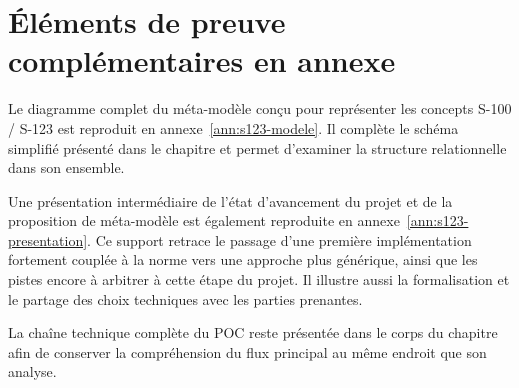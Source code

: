 
\section{Éléments de preuve complémentaires en annexe}

Le diagramme complet du méta-modèle conçu pour représenter les concepts S-100 / S-123 est reproduit en annexe~\ref{ann:s123-modele}. Il complète le schéma simplifié présenté dans le chapitre et permet d'examiner la structure relationnelle dans son ensemble.

Une présentation intermédiaire de l'état d'avancement du projet et de la proposition de méta-modèle est également reproduite en annexe~\ref{ann:s123-presentation}. Ce support retrace le passage d'une première implémentation fortement couplée à la norme vers une approche plus générique, ainsi que les pistes encore à arbitrer à cette étape du projet. Il illustre aussi la formalisation et le partage des choix techniques avec les parties prenantes.

La chaîne technique complète du POC reste présentée dans le corps du chapitre afin de conserver la compréhension du flux principal au même endroit que son analyse.
